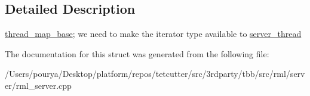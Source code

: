\subsection{Detailed Description}
\hyperlink{structrml_1_1internal_1_1thread__map__base}{thread\+\_\+map\+\_\+base}; we need to make the iterator type available to \hyperlink{classrml_1_1internal_1_1server__thread}{server\+\_\+thread} 

The documentation for this struct was generated from the following file\+:\begin{DoxyCompactItemize}
\item 
/\+Users/pourya/\+Desktop/platform/repos/tetcutter/src/3rdparty/tbb/src/rml/server/rml\+\_\+server.\+cpp\end{DoxyCompactItemize}
